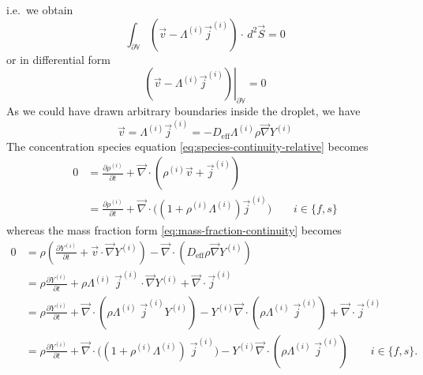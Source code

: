 \documentclass[11pt,twoside]{report}
\begin{document}
i.e.\ we obtain
\begin{equation*}
  \int_{\partial \mathbb{V}}
  (\vec{v} - \Lambda^{(i)} \vec{j}^{(i)})
  \cdot \, d^2\vec{S}
  = 0
\end{equation*}
or in differential form
\begin{equation}
  \left.
  (\vec{v} - \Lambda^{(i)} \vec{j}^{(i)})
  \right|_{\partial \mathbb{V}}
  = 0
\end{equation}
As we could have drawn arbitrary boundaries inside the droplet, we have
\begin{equation}
  \vec{v} =
  \Lambda^{(i)} \vec{j}^{(i)} =
  -D_{\textrm{eff}} \Lambda^{(i)} \rho \vec{\nabla} Y^{(i)}
\end{equation}
The concentration species equation \eqref{eq:species-continuity-relative} becomes
\begin{equation}\label{eq:species-continuity-advection-corrected}
  \begin{aligned}
    0 &=
    \frac{\partial \rho^{(i)}}{\partial t} +
    \vec{\nabla} \cdot
    \left(
    \rho^{(i)} \vec{v} +
    \vec{j}^{(i)}
    \right)
    \\
    &=
    \frac{\partial \rho^{(i)}}{\partial t} +
    \vec{\nabla} \cdot
    \Big(
    (1 + \rho^{(i)} \Lambda^{(i)})
    \vec{j}^{(i)} \Big)
    \qquad i \in \{f,s\}
  \end{aligned}
\end{equation}
whereas the mass fraction form \eqref{eq:mass-fraction-continuity} becomes
\begin{equation}
  \begin{aligned}
    0 &=
    \rho \left(
    \frac{\partial Y^{(i)}}{\partial t} +
    \vec{v} \cdot \vec{\nabla} Y^{(i)}
    \right)
    -
    \vec{\nabla} \cdot (D_{\textrm{eff}} \rho \vec{\nabla} Y^{(i)}) \\
    &=
    \rho
    \frac{\partial Y^{(i)}}{\partial t} +
    \rho \Lambda^{(i)} \; \vec{j}^{(i)} \cdot \vec{\nabla} Y^{(i)}
    +
    \vec{\nabla} \cdot \vec{j}^{(i)} \\
    &=
    \rho
    \frac{\partial Y^{(i)}}{\partial t} +
    \vec{\nabla} \cdot
    (\rho \Lambda^{(i)} \; \vec{j}^{(i)} Y^{(i)}) -
    Y^{(i)} \vec{\nabla} \cdot
    (\rho \Lambda^{(i)} \; \vec{j}^{(i)}) +
    \vec{\nabla} \cdot \vec{j}^{(i)}
    \\
    &=
    \rho
    \frac{\partial Y^{(i)}}{\partial t} +
    \vec{\nabla} \cdot
    \Big(
    (1 + \rho^{(i)} \Lambda^{(i)}) \;
    \vec{j}^{(i)} \Big) -
    Y^{(i)} \vec{\nabla} \cdot
    (\rho \Lambda^{(i)} \; \vec{j}^{(i)})
    \qquad i \in \{f,s\}.
  \end{aligned}
\end{equation}
\end{document}
